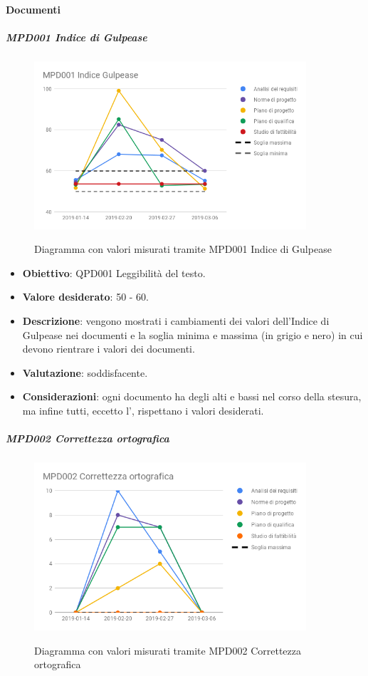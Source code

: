 	\paragraph{Documenti}

	\subparagraph{MPD001 Indice di Gulpease}

	\begin{figure}[H]
		\centering
		\includegraphics[width=0.9\textwidth]{img/cruscotti/RP/MPD001.png}
		\label{immaginegulpeaseRP}
		\caption{Diagramma con valori misurati tramite MPD001 Indice di Gulpease}
	\end{figure}

	\begin{itemize}
		\item \textbf{Obiettivo}: QPD001 Leggibilità del testo.
		\item \textbf{Valore desiderato}: 50 - 60.
		\item \textbf{Descrizione}: vengono mostrati i cambiamenti dei valori dell'Indice di Gulpease nei documenti e la soglia minima e massima (in grigio e nero) in cui devono rientrare i valori dei documenti.
		\item \textbf{Valutazione}: soddisfacente.
		\item \textbf{Considerazioni}: ogni documento ha degli alti e bassi nel corso della stesura, ma infine tutti, eccetto l'\AdR, rispettano i valori desiderati.
	\end{itemize}


	\subparagraph{MPD002 Correttezza ortografica}

	\begin{figure}[H]
		\centering
		\includegraphics[width=0.9\textwidth]{img/cruscotti/RP/MPD002.png}
		\label{immagineCorrettezzaOrtograficaRP}
		\caption{Diagramma con valori misurati tramite MPD002 Correttezza ortografica}
	\end{figure}

